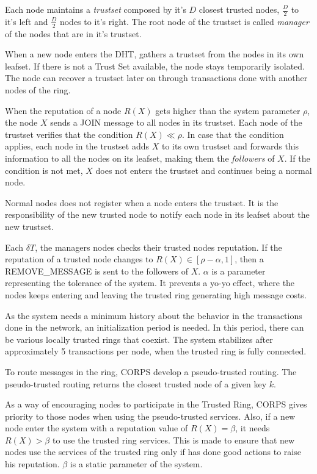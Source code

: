 Each node maintains a \textit{trustset} composed by it's $D$ closest trusted
nodes, $\frac{D}{2}$ to it's left and $\frac{D}{2}$ nodes to it's right.
The root node of the trustset is called \textit{manager} of the nodes that are
in it's trustset.

When a new node enters the DHT, gathers a trustset from the nodes in its own
leafset. If there is not a Trust Set available, the node stays temporarily
isolated. The node can recover a trustset later on through transactions done with
another nodes of the ring.

When the reputation of a node $R(X)$ gets higher than the system parameter
$\rho$, the node $X$ sends a JOIN message to all nodes in its trustset. Each
node of the trustset verifies that the condition $R(X) \ll \rho$. In case that
the condition  applies, each node in the trustset adds $X$ to its own trustset
and forwards this information to all the nodes on its leafset, making them the
\textit{followers} of $X$.
If the condition is not met, $X$ does not enters the trustset and continues
being a normal node.

Normal nodes does not register when a node enters the trustset. It is the
responsibility of the new trusted node to notify each node in its leafset about
the new trustset.

Each $\delta T$, the managers nodes checks their trusted nodes reputation. If
the reputation of a trusted node changes to $R(X) \in [\rho -\alpha, 1]$, then
a REMOVE\_MESSAGE is sent to the followers of $X$. $\alpha$ is a parameter
representing the tolerance of the system. It prevents a yo-yo effect, where the nodes keeps entering and
leaving the trusted ring generating high message costs.

As the system needs a minimum history about the behavior in the transactions
done in the network, an initialization period is needed. In this period, there
can be various locally trusted rings that coexist. The system stabilizes after
approximately 5 transactions per node, when the trusted ring is fully connected.

To route messages in the ring, CORPS develop a pseudo-trusted routing. The
pseudo-trusted routing returns the closest trusted node of a given key $k$.

As a way of encouraging nodes to participate in the Trusted Ring, CORPS gives
priority to those nodes when using the pseudo-trusted services.
Also, if a new node enter the system with a reputation value of $R(X) =
\beta$, it needs $R(X) > \beta$ to use the trusted ring services. This is
made to ensure that new nodes use the services of the trusted ring only if has done
good actions to raise his reputation. $\beta$ is a static parameter of the
system. 



